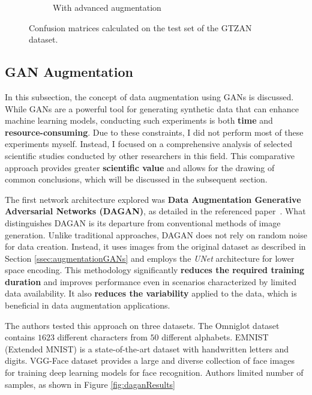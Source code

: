 \begin{figure}[h!]
\begin{subfigure}[b]{0.6\textwidth}
        \caption{With advanced augmentation}
    \end{subfigure}
    \caption{Confusion matrices calculated on the test set of the GTZAN dataset.}
    \label{fig:cmGTZAN}
\end{figure}

\newpage

\subsection{GAN Augmentation}

In this subsection, the concept of data augmentation using GANs is discussed. While GANs are a powerful tool for generating synthetic data that can enhance machine learning models, conducting such experiments is both \textbf{time} and \textbf{resource-consuming}. Due to these constraints, I did not perform most of these experiments myself. Instead, I focused on a comprehensive analysis of selected scientific studies conducted by other researchers in this field. This comparative approach provides greater \textbf{scientific value} and allows for the drawing of common conclusions, which will be discussed in the subsequent section.

The first network architecture explored was \textbf{Data Augmentation Generative Adversarial Networks (DAGAN)}, as detailed in the referenced paper~\cite{DAGANPaper}. What distinguishes DAGAN is its departure from conventional methods of image generation. Unlike traditional approaches, DAGAN does not rely on random noise for data creation. Instead, it uses images from the original dataset as described in Section \ref{ssec:augmentationGANs} and employs the \textit{UNet} architecture for lower space encoding. This methodology significantly \textbf{reduces the required training duration} and improves performance even in scenarios characterized by limited data availability. It also \textbf{reduces the variability} applied to the data, which is beneficial in data augmentation applications.

The authors tested this approach on three datasets. The Omniglot dataset contains $1623$ different characters from $50$ different alphabets. EMNIST (Extended MNIST) is a state-of-the-art dataset with handwritten letters and digits. VGG-Face dataset provides a large and diverse collection of face images for training deep learning models for face recognition. Authors limited number of samples, as shown in Figure \ref{fig:daganResults}

